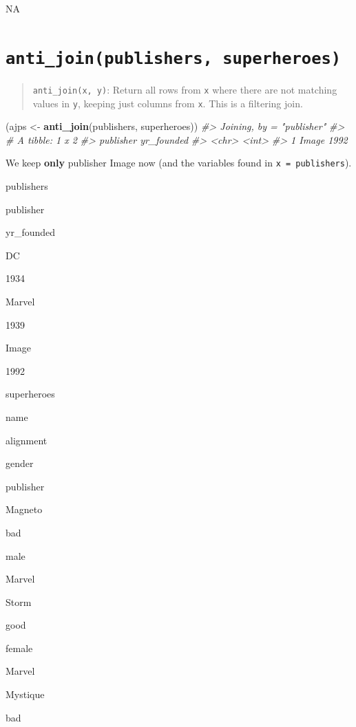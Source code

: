 \documentclass[
]{book}
\newenvironment{Shaded}{\begin{snugshade}}{\end{snugshade}}
\newcommand{\CommentTok}[1]{\textcolor[rgb]{0.56,0.35,0.01}{\textit{#1}}}
\newcommand{\KeywordTok}[1]{\textcolor[rgb]{0.13,0.29,0.53}{\textbf{#1}}}
\newcommand{\NormalTok}[1]{#1}
\newcommand{\StringTok}[1]{\textcolor[rgb]{0.31,0.60,0.02}{#1}}
\begin{document}
NA

\hypertarget{anti_joinpublishers-superheroes}{%
\section{\texorpdfstring{\texttt{anti\_join(publishers,\ superheroes)}}{anti\_join(publishers, superheroes)}}\label{anti_joinpublishers-superheroes}}

\begin{quote}
\texttt{anti\_join(x,\ y)}: Return all rows from \texttt{x} where there are not matching values in \texttt{y}, keeping just columns from \texttt{x}. This is a filtering join.
\end{quote}

\begin{Shaded}
\begin{Highlighting}[]
\NormalTok{(ajps <-}\StringTok{ }\KeywordTok{anti_join}\NormalTok{(publishers, superheroes))}
\CommentTok{#> Joining, by = "publisher"}
\CommentTok{#> # A tibble: 1 x 2}
\CommentTok{#>   publisher yr_founded}
\CommentTok{#>   <chr>          <int>}
\CommentTok{#> 1 Image           1992}
\end{Highlighting}
\end{Shaded}

We keep \textbf{only} publisher Image now (and the variables found in \texttt{x\ =\ publishers}).

publishers

publisher

yr\_founded

DC

1934

Marvel

1939

Image

1992

superheroes

name

alignment

gender

publisher

Magneto

bad

male

Marvel

Storm

good

female

Marvel

Mystique

bad
\end{document}
